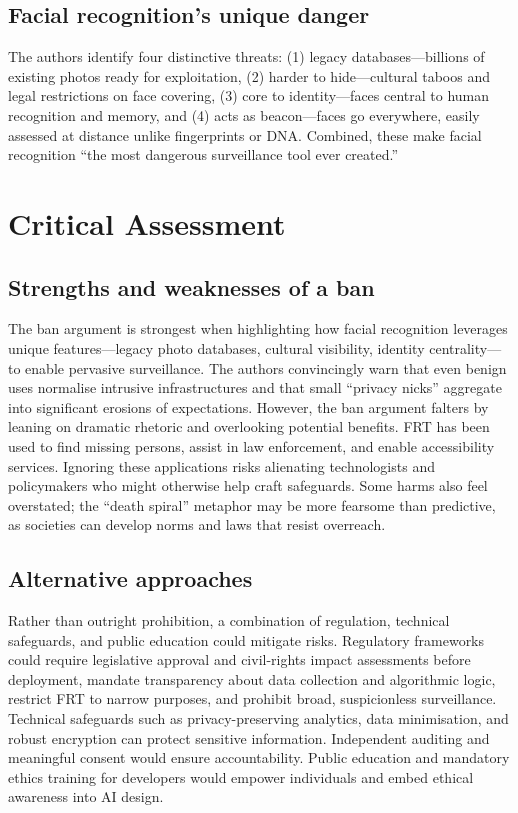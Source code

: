 \documentclass[11pt,twoside]{article}
\begin{document}
\subsection{Facial recognition's unique danger}
The authors identify four distinctive threats: (1) legacy databases—billions of existing photos ready for exploitation, (2) harder to hide—cultural taboos and legal restrictions on face covering, (3) core to identity—faces central to human recognition and memory, and (4) acts as beacon—faces go everywhere, easily assessed at distance unlike fingerprints or DNA.  Combined, these make facial recognition \enquote{the most dangerous surveillance tool ever created.}

\section{Critical Assessment}

\subsection{Strengths and weaknesses of a ban}
The ban argument is strongest when highlighting how facial recognition leverages unique features—legacy photo databases, cultural visibility, identity centrality—to enable pervasive surveillance.  The authors convincingly warn that even benign uses normalise intrusive infrastructures and that small \enquote{privacy nicks} aggregate into significant erosions of expectations.  However, the ban argument falters by leaning on dramatic rhetoric and overlooking potential benefits.  FRT has been used to find missing persons, assist in law enforcement, and enable accessibility services.  Ignoring these applications risks alienating technologists and policymakers who might otherwise help craft safeguards.  Some harms also feel overstated; the \enquote{death spiral} metaphor may be more fearsome than predictive, as societies can develop norms and laws that resist overreach.

\subsection{Alternative approaches}
Rather than outright prohibition, a combination of regulation, technical safeguards, and public education could mitigate risks.  Regulatory frameworks could require legislative approval and civil-rights impact assessments before deployment, mandate transparency about data collection and algorithmic logic, restrict FRT to narrow purposes, and prohibit broad, suspicionless surveillance.  Technical safeguards such as privacy-preserving analytics, data minimisation, and robust encryption can protect sensitive information.  Independent auditing and meaningful consent would ensure accountability.  Public education and mandatory ethics training for developers would empower individuals and embed ethical awareness into AI design.
\end{document}
